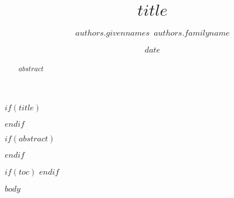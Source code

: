 \documentclass[12pt]{article}
\title{$title$}
\date{$date$}
\author[$for(authors.affiliations)$$authors.affiliations$$sep$,$endfor$]{$authors.givennames$~$authors.familyname$}
\affil[$affiliations.index$]{$affiliations.name$}
\begin{document}
$if(title)$
\maketitle
$endif$

$if(abstract)$
\begin{abstract}
$abstract$
\end{abstract}
$endif$

$if(toc)$
\tableofcontents
$endif$


\linenumbers

$body$
\end{document}
